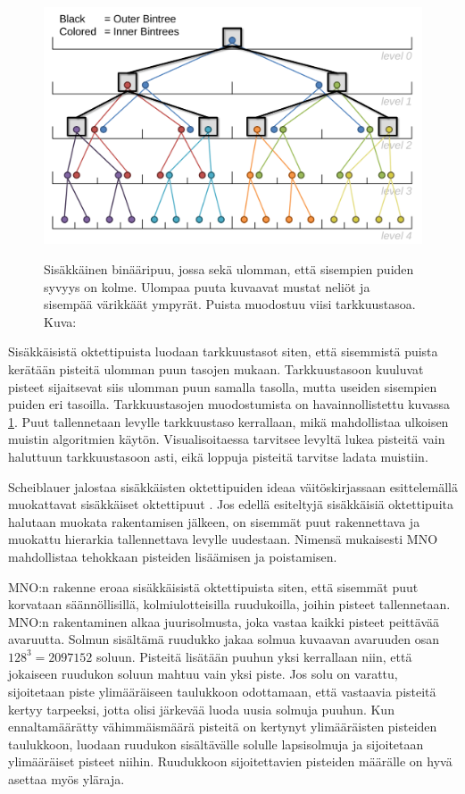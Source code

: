 \begin{figure}
    \centering
    \includegraphics[width=0.6\paperwidth]{img/nested.png}
    \label{nested}
    \caption{Sisäkkäinen binääripuu, jossa sekä ulomman, että sisempien puiden syvyys on kolme. Ulompaa puuta kuvaavat mustat neliöt ja sisempää värikkäät ympyrät. Puista muodostuu viisi tarkkuustasoa. Kuva: \cite{scheiblauer}}
\end{figure}

Sisäkkäisistä oktettipuista luodaan tarkkuustasot siten, että sisemmistä puista kerätään pisteitä ulomman puun tasojen mukaan. Tarkkuustasoon kuuluvat pisteet sijaitsevat siis ulomman puun samalla tasolla, mutta useiden sisempien puiden eri tasoilla. Tarkkuustasojen muodostumista on havainnollistettu kuvassa \ref{nested}. Puut tallennetaan levylle tarkkuustaso kerrallaan, mikä mahdollistaa ulkoisen muistin algoritmien käytön. Visualisoitaessa tarvitsee levyltä lukea pisteitä vain haluttuun tarkkuustasoon asti, eikä loppuja pisteitä tarvitse ladata muistiin. \cite{ip}

Scheiblauer jalostaa sisäkkäisten oktettipuiden ideaa väitöskirjassaan esittelemällä muokattavat sisäkkäiset oktettipuut . Jos edellä esiteltyjä sisäkkäisiä oktettipuita halutaan muokata rakentamisen jälkeen, on sisemmät puut rakennettava ja muokattu hierarkia tallennettava levylle uudestaan. Nimensä mukaisesti MNO mahdollistaa tehokkaan pisteiden lisäämisen ja poistamisen. \cite{scheiblauer}  

MNO:n rakenne eroaa sisäkkäisistä oktettipuista siten, että sisemmät puut korvataan säännöllisillä, kolmiulotteisilla ruudukoilla, joihin pisteet tallennetaan. MNO:n rakentaminen alkaa juurisolmusta, joka vastaa kaikki pisteet peittävää avaruutta. Solmun sisältämä ruudukko jakaa solmua kuvaavan avaruuden osan $128^3 = 2 097 152$ soluun. Pisteitä lisätään puuhun yksi kerrallaan niin, että jokaiseen ruudukon soluun mahtuu vain yksi piste. Jos solu on varattu, sijoitetaan piste ylimääräiseen taulukkoon odottamaan, että vastaavia pisteitä kertyy tarpeeksi, jotta olisi järkevää luoda uusia solmuja puuhun. Kun ennaltamäärätty vähimmäismäärä pisteitä on kertynyt ylimääräisten pisteiden taulukkoon, luodaan ruudukon sisältävälle solulle lapsisolmuja ja sijoitetaan ylimääräiset pisteet niihin. Ruudukkoon sijoitettavien pisteiden määrälle on hyvä asettaa myös yläraja. \cite{scheiblauer}

